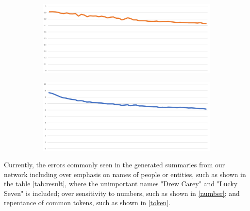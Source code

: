 \documentclass[11pt,a4paper]{article}
\begin{document}
\begin{figure}[h!]
    \centering
    \caption{Training Statistics Plot}
    \label{fig:loss}
    \begin{subfigure}{\linewidth}
    \centering
    \includegraphics[width=\linewidth]{critic.png}
    \end{subfigure}
    \begin{subfigure}{\linewidth}
    \centering
    \includegraphics[width=\linewidth]{loss.png}
    \end{subfigure}
\end{figure}

Currently, the errors commonly seen in the generated summaries from our network including over emphasis on names of people or entities, such as shown in the table \ref{tab:result}, where the unimportant names "Drew Carey" and "Lucky Seven" is included; over sensitivity to numbers, such as shown in \ref{number}; and repentance of common tokens, such as shown in \ref{token}.
\end{document}
